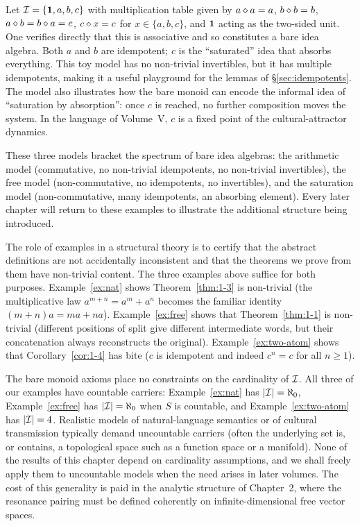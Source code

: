 \begin{example}\label{ex:two-atom}
Let $\mathcal{I} = \{ \mathbf{1}, a, b, c \}$ with multiplication table given by
$a \mathbin{\diamond} a = a$, $b \mathbin{\diamond} b = b$, $a \mathbin{\diamond} b = b \mathbin{\diamond} a = c$,
$c \mathbin{\diamond} x = c$ for $x \in \{a, b, c\}$, and $\mathbf{1}$ acting as the
two-sided unit.  One verifies directly that this is associative and so
constitutes a bare idea algebra.  Both $a$ and $b$ are idempotent;
$c$ is the ``saturated'' idea that absorbs everything.  This toy model
has no non-trivial invertibles, but it has multiple idempotents, making it
a useful playground for the lemmas of \S\ref{sec:idempotents}.  The model
also illustrates how the bare monoid can encode the informal idea of
``saturation by absorption'': once $c$ is reached, no further composition
moves the system.  In the language of Volume~V, $c$ is a fixed point of
the cultural-attractor dynamics.
\end{example}

These three models bracket the spectrum of bare idea algebras: the
arithmetic model (commutative, no non-trivial idempotents, no
non-trivial invertibles), the free model (non-commutative, no
idempotents, no invertibles), and the saturation model (non-commutative,
many idempotents, an absorbing element).  Every later chapter will return
to these examples to illustrate the additional structure being introduced.

\begin{remark}
The role of examples in a structural theory is to certify that the
abstract definitions are not accidentally inconsistent and that the
theorems we prove from them have non-trivial content.  The three examples
above suffice for both purposes.  Example~\ref{ex:nat} shows
Theorem~\ref{thm:1-3} is non-trivial (the multiplicative law $a^{m+n} =
a^m + a^n$ becomes the familiar identity $(m+n)a = ma + na$).
Example~\ref{ex:free} shows that Theorem~\ref{thm:1-1} is
non-trivial (different positions of split give different intermediate
words, but their concatenation always reconstructs the original).
Example~\ref{ex:two-atom} shows that Corollary~\ref{cor:1-4} has bite
($c$ is idempotent and indeed $c^n = c$ for all $n \ge 1$).
\end{remark}

\begin{remark}
The bare monoid axioms place no constraints on the cardinality of
$\mathcal{I}$.  All three of our examples have countable carriers:
Example~\ref{ex:nat} has $|\mathcal{I}| = \aleph_0$, Example~\ref{ex:free}
has $|\mathcal{I}| = \aleph_0$ when $S$ is countable, and Example~\ref{ex:two-atom}
has $|\mathcal{I}| = 4$.  Realistic models of natural-language semantics or
of cultural transmission typically demand uncountable carriers (often
the underlying set is, or contains, a topological space such as a
function space or a manifold).  None of the results of this chapter
depend on cardinality assumptions, and we shall freely apply them to
uncountable models when the need arises in later volumes.  The cost of
this generality is paid in the analytic structure of Chapter~2, where
the resonance pairing must be defined coherently on infinite-dimensional
free vector spaces.
\end{remark}

